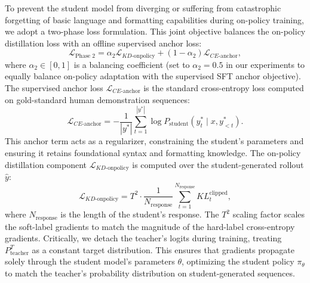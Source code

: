 To prevent the student model from diverging or suffering from catastrophic forgetting of basic language and formatting capabilities during on-policy training, we adopt a two-phase loss formulation. This joint objective balances the on-policy distillation loss with an offline supervised anchor loss:
\begin{equation}
    \mathcal{L}_{\text{Phase 2}} = \alpha_2 \mathcal{L}_{KD\text{-onpolicy}} + (1 - \alpha_2) \mathcal{L}_{CE\text{-anchor}},
\end{equation}
where $\alpha_2 \in [0, 1]$ is a balancing coefficient (set to $\alpha_2 = 0.5$ in our experiments to equally balance on-policy adaptation with the supervised SFT anchor objective). The supervised anchor loss $\mathcal{L}_{CE\text{-anchor}}$ is the standard cross-entropy loss computed on gold-standard human demonstration sequences:
\begin{equation}
    \mathcal{L}_{CE\text{-anchor}} = - \frac{1}{|y^*|} \sum_{t=1}^{|y^*|} \log P_{\text{student}}(y_t^* \mid x, y_{<t}^*).
\end{equation}
This anchor term acts as a regularizer, constraining the student's parameters and ensuring it retains foundational syntax and formatting knowledge. The on-policy distillation component $\mathcal{L}_{KD\text{-onpolicy}}$ is computed over the student-generated rollout $\hat{y}$:
\begin{equation}
    \mathcal{L}_{KD\text{-onpolicy}} = T^2 \cdot \frac{1}{N_{\text{response}}} \sum_{t=1}^{N_{\text{response}}} KL_t^{\text{clipped}},
\end{equation}
where $N_{\text{response}}$ is the length of the student's response. The $T^2$ scaling factor scales the soft-label gradients to match the magnitude of the hard-label cross-entropy gradients. Critically, we detach the teacher's logits during training, treating $P_{\text{teacher}}^T$ as a constant target distribution. This ensures that gradients propagate solely through the student model's parameters $\theta$, optimizing the student policy $\pi_\theta$ to match the teacher's probability distribution on student-generated sequences.


